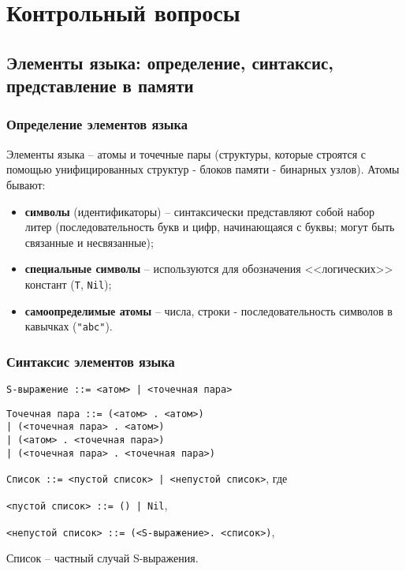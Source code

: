 \chapter{Контрольный вопросы}

\section{Элементы языка: определение, синтаксис, представление в памяти}

\subsection*{Определение элементов языка}

Элементы языка -- атомы и точечные пары (структуры, которые строятся с помощью унифицированных структур - блоков памяти - бинарных узлов). Атомы бывают:
\begin{itemize}
    \item \textbf{символы} (идентификаторы) -- синтаксически представляют собой набор литер (последовательность букв и цифр, начинающаяся с буквы; могут быть связанные и несвязанные);
    \item \textbf{специальные символы} -- используются для обозначения <<логических>> констант (\texttt{T}, \texttt{Nil});
    \item \textbf{самоопределимые атомы} -- числа, строки - последовательность символов в кавычках (\texttt{"abc"}).
\end{itemize}

\subsection*{Синтаксис элементов языка}

\texttt{S-выражение ::= <атом> | <точечная пара>}

\texttt{Точечная пара ::= (<атом> . <атом>) \\
\indent\indent| (<точечная пара> . <атом>) \\
\indent\indent| (<атом> . <точечная пара>) \\
\indent\indent| (<точечная пара> . <точечная пара>)}

\texttt{Список ::= <пустой список> | <непустой список>}, где 

\texttt{<пустой список> ::= () | Nil},

\texttt{<непустой список> ::= (<S-выражение>. <список>)},

Список -- частный случай S-выражения.

